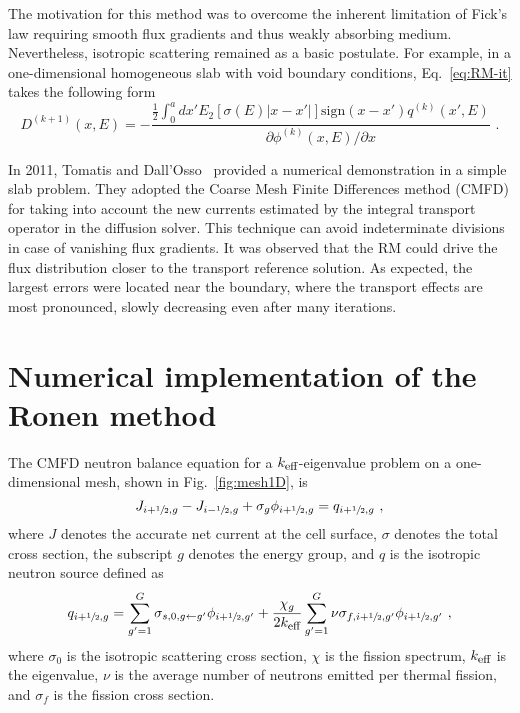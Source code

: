 \documentclass[letterpaper]{physor2020}
\newcommand{\keff}{{\ensuremath{k_{\textrm{\scriptsize{eff}}}}}}
\newcommand{\hzi}{\ensuremath{\sfrac{1}{2}}}
\begin{document}
The motivation for this method was to overcome the inherent limitation of Fick's law requiring smooth flux gradients and thus weakly absorbing medium. Nevertheless, isotropic scattering remained as a basic postulate. For example, in a one-dimensional homogeneous slab with void boundary conditions, Eq.~\eqref{eq:RM-it} takes the following form~\cite{Ronen-2004} 
\begin{equation}\label{eq:RM-it-1D-slab}
D^{(k+1)}(x,E) = -\frac{\frac{1}{2}\int_0^a dx' E_2[\sigma(E)\lvert
	x-x'\rvert]\text{sign}(x-x')q^{(k)}(x',E)}
{\partial \phi^{(k)}(x,E)/\partial x} \,\, .
\end{equation}

In 2011, Tomatis and Dall'Osso~\cite{Tomatis-2011} provided a numerical demonstration in a simple slab problem. They adopted the Coarse Mesh Finite Differences method (CMFD) for taking into account the new currents estimated by the integral transport operator in the diffusion solver. 
%
%
This technique can avoid indeterminate divisions in case of vanishing flux gradients. It was observed that the RM could drive the flux distribution closer to the transport reference solution. As expected, the largest errors were located near the boundary, where the transport effects are most pronounced, slowly decreasing even after many iterations.%


\section{Numerical implementation of the Ronen method} 
\label{sec:RM-num}

The CMFD neutron balance equation for a $\keff$-eigenvalue problem on a one-dimensional mesh, shown in Fig.~\ref{fig:mesh1D}, is
\begin{equation}\label{eq:balance}
J_{i+\hzi,g} - J_{i-\hzi,g} + \sigma_g \phi_{i+\hzi,g} = q_{i+\hzi,g} \,\, , 
\end{equation}	
where $J$ denotes the accurate net current at the cell surface, $\sigma$ denotes the total cross section, the subscript $g$ denotes the energy group, and $q$ is the isotropic neutron source defined as
\begin{equation}\label{eq:qsrc}
q_{i+\hzi,g} = \sum\limits_{g'=1}^G\sigma_{s,0,g\leftarrow g'}\phi_{i+\hzi,g'} +
\frac{\chi_g}{2\keff}\sum\limits_{g'=1}^G\nu\sigma_{f,i+\hzi,g'}\phi_{i+\hzi,g'} \,\, ,
\end{equation}	
where $\sigma_0$ is the isotropic scattering cross section, $\chi$ is the fission spectrum, $\keff$ is the eigenvalue, $\nu$ is the average number of neutrons emitted per thermal fission, and $\sigma_f$ is the fission cross section.   
\end{document}
